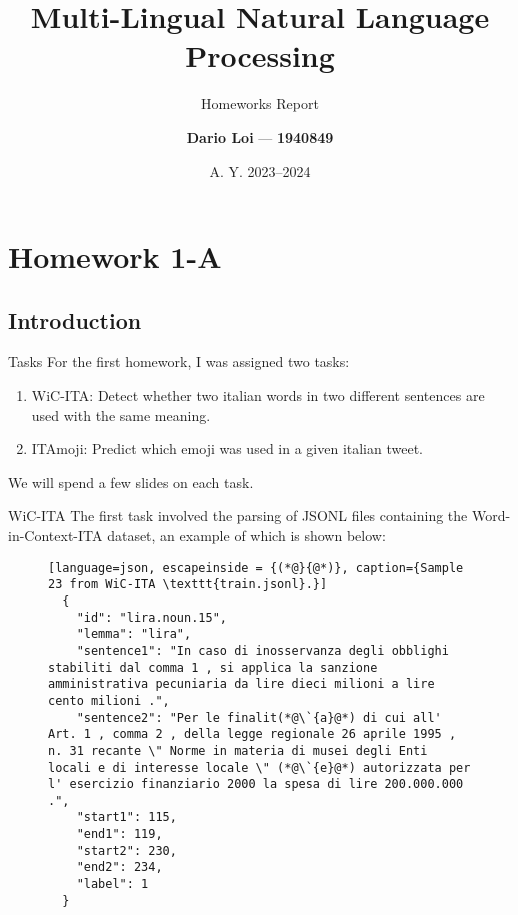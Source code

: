 \documentclass[english, xcolor={table,usenames}]{beamer}
\author{\textbf{Dario Loi} --- \textbf{1940849}}
\title{Multi-Lingual Natural Language Processing}
\subtitle{Homeworks Report}
\institute{M.Sc. in AI \& Robotics, \\ Sapienza, University of Rome.}
\date{A. Y. 2023--2024}
\begin{document}
\maketitle

\section{Homework 1-A}

\subsection{Introduction}
\begin{frame}{Tasks}
  For the first homework, I was assigned \alert{two} tasks:

  \begin{enumerate}
    \item WiC-ITA: Detect whether two italian words in two \alert{different} sentences are used with the \alert{same} meaning.
    \item ITAmoji: Predict which emoji was used in a given italian tweet.
  \end{enumerate}

  We will spend a few slides on each task.
\end{frame}


\begin{frame}[fragile]{WiC-ITA}
  The first task involved the parsing of JSONL files containing the Word-in-Context-ITA dataset, an example of which is shown below:


  \begin{figure}[H]
    \centering
    \begin{lstlisting}[language=json, escapeinside = {(*@}{@*)}, caption={Sample 23 from WiC-ITA \texttt{train.jsonl}.}]
  {
    "id": "lira.noun.15",
    "lemma": "lira",
    "sentence1": "In caso di inosservanza degli obblighi stabiliti dal comma 1 , si applica la sanzione amministrativa pecuniaria da lire dieci milioni a lire cento milioni .",
    "sentence2": "Per le finalit(*@\`{a}@*) di cui all' Art. 1 , comma 2 , della legge regionale 26 aprile 1995 , n. 31 recante \" Norme in materia di musei degli Enti locali e di interesse locale \" (*@\`{e}@*) autorizzata per l' esercizio finanziario 2000 la spesa di lire 200.000.000 .",
    "start1": 115,
    "end1": 119,
    "start2": 230,
    "end2": 234,
    "label": 1
  }
  \end{lstlisting}
  \end{figure}

\end{frame}
\end{document}
